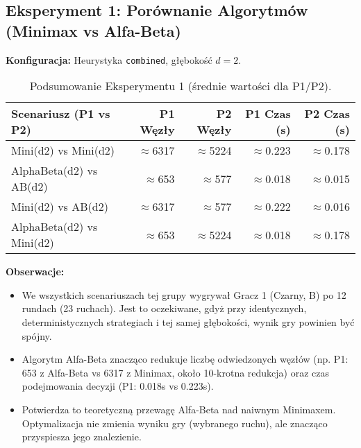 \documentclass[11pt,a4paper]{article}
\newcommand{\code}[1]{\texttt{#1}} %
\begin{document}
\subsection{Eksperyment 1: Porównanie Algorytmów (Minimax vs Alfa-Beta)}
\textbf{Konfiguracja:} Heurystyka \code{combined}, głębokość $d=2$.
\begin{table}[H]
    \centering
    \caption{Podsumowanie Eksperymentu 1 (średnie wartości dla P1/P2).}
    \begin{tabular}{lrrrr}
        \toprule
        Scenariusz (P1 vs P2) & P1 Węzły & P2 Węzły & P1 Czas (s) & P2 Czas (s) \\
        \midrule
        Mini(d2) vs Mini(d2)     & $\approx$6317 & $\approx$5224 & $\approx$0.223 & $\approx$0.178 \\
        AlphaBeta(d2) vs AB(d2)  & $\approx$653  & $\approx$577  & $\approx$0.018 & $\approx$0.015 \\
        Mini(d2) vs AB(d2)       & $\approx$6317 & $\approx$577  & $\approx$0.222 & $\approx$0.016 \\
        AlphaBeta(d2) vs Mini(d2)& $\approx$653  & $\approx$5224 & $\approx$0.018 & $\approx$0.178 \\
        \bottomrule
    \end{tabular}
    \label{tab:e1_summary}
\end{table}
\textbf{Obserwacje:}
\begin{itemize}
    \item We wszystkich scenariuszach tej grupy wygrywał Gracz 1 (Czarny, B) po 12 rundach (23 ruchach). Jest to oczekiwane, gdyż przy identycznych, deterministycznych strategiach i tej samej głębokości, wynik gry powinien być spójny.
    \item Algorytm Alfa-Beta znacząco redukuje liczbę odwiedzonych węzłów (np. P1: 653 z Alfa-Beta vs 6317 z Minimax, około 10-krotna redukcja) oraz czas podejmowania decyzji (P1: 0.018s vs 0.223s).
    \item Potwierdza to teoretyczną przewagę Alfa-Beta nad naiwnym Minimaxem. Optymalizacja nie zmienia wyniku gry (wybranego ruchu), ale znacząco przyspiesza jego znalezienie.
\end{itemize}
\end{document}
